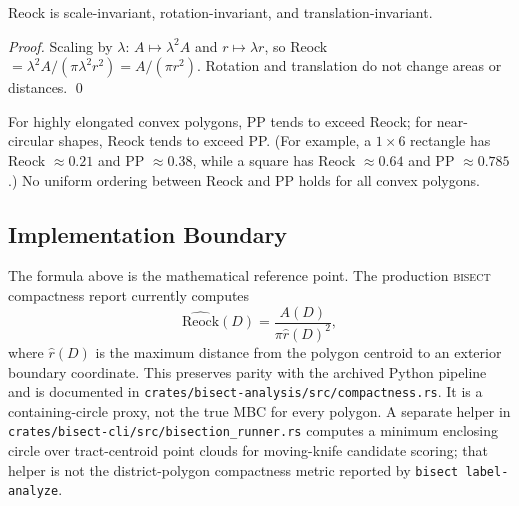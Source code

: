 \begin{proposition}
  Reock is scale-invariant, rotation-invariant, and translation-invariant.
\end{proposition}

\begin{proof}
  Scaling by $\lambda$: $A \mapsto \lambda^2 A$ and $r \mapsto \lambda r$,
  so Reock $= \lambda^2 A / (\pi \lambda^2 r^2) = A/(\pi r^2)$.
  Rotation and translation do not change areas or distances. \qed
\end{proof}

For highly elongated convex polygons, PP tends to exceed Reock; for near-circular
shapes, Reock tends to exceed PP.
(For example, a $1 \times 6$ rectangle has Reock $\approx 0.21$ and PP $\approx 0.38$,
while a square has Reock $\approx 0.64$ and PP $\approx 0.785$.)
No uniform ordering between Reock and PP holds for all convex polygons.

\subsection{Implementation Boundary}

The formula above is the mathematical reference point.  The production
\textsc{bisect} compactness report currently computes
\[
  \widehat{\text{Reock}}(D)
  = \frac{A(D)}{\pi \hat r(D)^2},
\]
where $\hat r(D)$ is the maximum distance from the polygon centroid to an
exterior boundary coordinate.  This preserves parity with the archived Python
pipeline and is documented in
\texttt{crates/bisect-analysis/src/compactness.rs}.  It is a containing-circle
proxy, not the true MBC for every polygon.  A separate helper in
\texttt{crates/bisect-cli/src/bisection\_runner.rs} computes a minimum enclosing
circle over tract-centroid point clouds for moving-knife candidate scoring; that
helper is not the district-polygon compactness metric reported by
\texttt{bisect label-analyze}.
